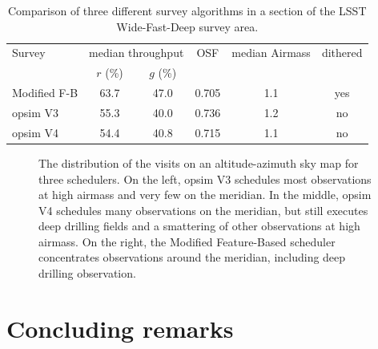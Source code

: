 \documentclass[12pt]{aastex62}
\theoremstyle{definition}
\begin{document}
\begin{table}
\caption{Comparison of three different survey algorithms in a section of the LSST Wide-Fast-Deep survey area.}\label{OSF_table}
\begin{center}
\begin{tabular}{l|ccccc} \hline
Survey &\multicolumn{2}{c}{median throughput} & OSF & median Airmass & dithered\\
&$r$ (\%) &  $g$ (\%) &&&\\ \hline
Modified F-B & 63.7 & 47.0& 0.705 & 1.1 & yes  \\
opsim V3      & 55.3 & 40.0 & 0.736 & 1.2 & no  \\
opsim V4      & 54.4 & 40.8 & 0.715 & 1.1 & no \\ \hline
\end{tabular}
\end{center}
\end{table}



\begin{figure}
\caption{The distribution of the visits on an altitude-azimuth sky map for three schedulers. On the left, opsim V3 schedules most observations at high airmass and very few on the meridian. In the middle, opsim V4 schedules many observations on the meridian, but still executes deep drilling fields and a smattering of other observations at high airmass. On the right, the Modified Feature-Based scheduler concentrates observations around the meridian, including deep drilling observation. }\label{fig_all_alt_az}
\end{figure}

\section{Concluding remarks}\label{sec_conclusion}
\end{document}
